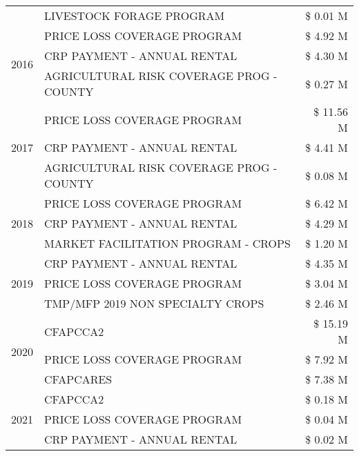 \begin{tabular}{llr}
 & LIVESTOCK FORAGE PROGRAM & \$ 0.01 M \\
\cline{1-3}
\multirow[t]{3}{*}{2016} & PRICE LOSS COVERAGE PROGRAM                   & \$ 4.92 M \\
 & CRP PAYMENT - ANNUAL RENTAL                   & \$ 4.30 M \\
 & AGRICULTURAL RISK COVERAGE PROG - COUNTY      & \$ 0.27 M \\
\cline{1-3}
\multirow[t]{3}{*}{2017} & PRICE LOSS COVERAGE PROGRAM & \$ 11.56 M \\
 & CRP PAYMENT - ANNUAL RENTAL & \$ 4.41 M \\
 & AGRICULTURAL RISK COVERAGE PROG - COUNTY & \$ 0.08 M \\
\cline{1-3}
\multirow[t]{3}{*}{2018} & PRICE LOSS COVERAGE PROGRAM & \$ 6.42 M \\
 & CRP PAYMENT - ANNUAL RENTAL & \$ 4.29 M \\
 & MARKET FACILITATION PROGRAM - CROPS & \$ 1.20 M \\
\cline{1-3}
\multirow[t]{3}{*}{2019} & CRP PAYMENT - ANNUAL RENTAL & \$ 4.35 M \\
 & PRICE LOSS COVERAGE PROGRAM & \$ 3.04 M \\
 & TMP/MFP 2019 NON SPECIALTY CROPS & \$ 2.46 M \\
\cline{1-3}
\multirow[t]{3}{*}{2020} & CFAPCCA2 & \$ 15.19 M \\
 & PRICE LOSS COVERAGE PROGRAM & \$ 7.92 M \\
 & CFAPCARES & \$ 7.38 M \\
\cline{1-3}
\multirow[t]{3}{*}{2021} & CFAPCCA2 & \$ 0.18 M \\
 & PRICE LOSS COVERAGE PROGRAM & \$ 0.04 M \\
 & CRP PAYMENT - ANNUAL RENTAL & \$ 0.02 M \\
\cline{1-3}
\bottomrule
\end{tabular}
